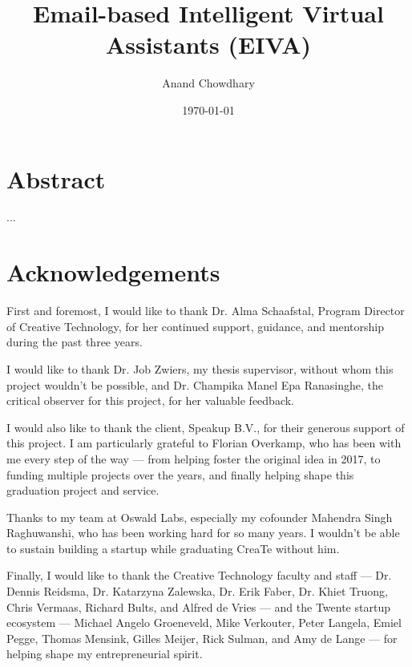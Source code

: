 \documentclass{article}
\title{Email-based Intelligent Virtual Assistants (EIVA)}
\author{Anand Chowdhary}
\date{\today}
\begin{document}

\maketitle

\newpage


\section*{Abstract}

...

\newpage

\section*{Acknowledgements}

First and foremost, I would like to thank Dr. Alma Schaafstal, Program Director of Creative Technology, for her continued support, guidance, and mentorship during the past three years.

I would like to thank Dr. Job Zwiers, my thesis supervisor, without whom this project wouldn't be possible, and Dr. Champika Manel Epa Ranasinghe, the critical observer for this project, for her valuable feedback.

I would also like to thank the client, Speakup B.V., for their generous support of this project. I am particularly grateful to Florian Overkamp, who has been with me every step of the way --- from helping foster the original idea in 2017, to funding multiple projects over the years, and finally helping shape this graduation project and service.

Thanks to my team at Oswald Labs, especially my cofounder Mahendra Singh Raghuwanshi, who has been working hard for so many years. I wouldn't be able to sustain building a startup while graduating CreaTe without him.

Finally, I would like to thank the Creative Technology faculty and staff --- Dr. Dennis Reidsma, Dr. Katarzyna Zalewska, Dr. Erik Faber, Dr. Khiet Truong, Chris Vermaas, Richard Bults, and Alfred de Vries --- and the Twente startup ecosystem --- Michael Angelo Groeneveld, Mike Verkouter, Peter Langela, Emiel Pegge, Thomas Mensink, Gilles Meijer, Rick Sulman, and Amy de Lange --- for helping shape my entrepreneurial spirit.

\newpage

\tableofcontents
\end{document}
